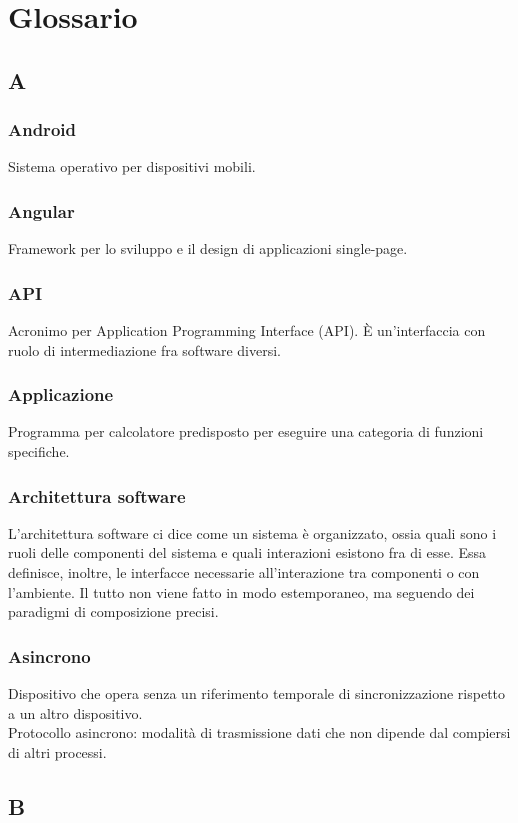 \section{Glossario}


\subsection*{A}
\subsubsection*{Android} Sistema operativo per dispositivi mobili.
\subsubsection*{Angular} Framework per lo sviluppo e il design di applicazioni single-page.
\subsubsection*{API} Acronimo per Application Programming Interface (API). È un'interfaccia con ruolo di intermediazione fra software diversi.
\subsubsection*{Applicazione} Programma per calcolatore predisposto per eseguire una categoria di funzioni specifiche.
\subsubsection*{Architettura software} L’architettura software ci dice come un sistema è organizzato, ossia quali sono i ruoli delle componenti del sistema e quali interazioni esistono fra di esse. Essa definisce, inoltre, le interfacce necessarie all’interazione tra componenti o con l’ambiente. Il tutto non viene fatto in modo estemporaneo, ma seguendo dei paradigmi di composizione precisi.
\subsubsection*{Asincrono} Dispositivo che opera senza un riferimento temporale di sincronizzazione rispetto a un altro dispositivo. \\
Protocollo asincrono: modalità di trasmissione dati che non dipende dal compiersi di altri processi.

\subsection*{B}

